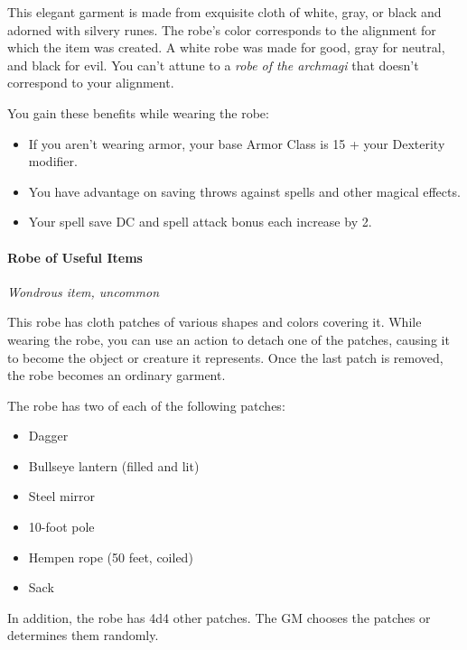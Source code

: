\documentclass[
]{article}
\providecommand{\tightlist}{%
  \setlength{\itemsep}{0pt}\setlength{\parskip}{0pt}}
\begin{document}
This elegant garment is made from exquisite cloth of white, gray, or
black and adorned with silvery runes. The robe's color corresponds to
the alignment for which the item was created. A white robe was made for
good, gray for neutral, and black for evil. You can't attune to a
\emph{robe of the archmagi} that doesn't correspond to your alignment.

You gain these benefits while wearing the robe:

\begin{itemize}
\tightlist
\item
  If you aren't wearing armor, your base Armor Class is 15 + your
  Dexterity modifier.
\item
  You have advantage on saving throws against spells and other magical
  effects.
\item
  Your spell save DC and spell attack bonus each increase by 2.
\end{itemize}

\hypertarget{robe-of-useful-items}{%
\paragraph{Robe of Useful Items}\label{robe-of-useful-items}}

\emph{Wondrous item, uncommon}

This robe has cloth patches of various shapes and colors covering it.
While wearing the robe, you can use an action to detach one of the
patches, causing it to become the object or creature it represents. Once
the last patch is removed, the robe becomes an ordinary garment.

The robe has two of each of the following patches:

\begin{itemize}
\tightlist
\item
  Dagger
\item
  Bullseye lantern (filled and lit)
\item
  Steel mirror
\item
  10-foot pole
\item
  Hempen rope (50 feet, coiled)
\item
  Sack
\end{itemize}

In addition, the robe has 4d4 other patches. The GM chooses the patches
or determines them randomly.
\end{document}
